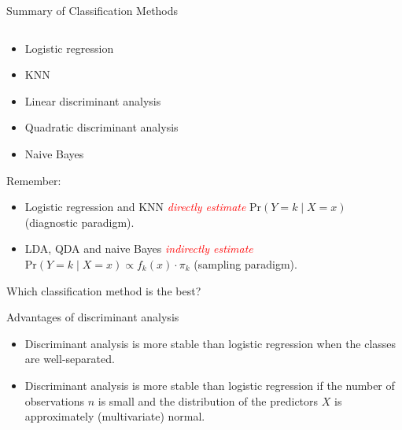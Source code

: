 \documentclass[10pt,ignorenonframetext,]{beamer}
\providecommand{\tightlist}{%
  \setlength{\itemsep}{0pt}\setlength{\parskip}{0pt}}
\begin{document}
\begin{frame}

\begin{block}{Summary of Classification Methods}

\(~\)

\begin{itemize}
\item
  Logistic regression
\item
  KNN
\item
  Linear discriminant analysis
\item
  Quadratic discriminant analysis
\item
  Naive Bayes
\end{itemize}

\vspace{4mm}

Remember:

\begin{itemize}
\tightlist
\item
  Logistic regression and KNN \emph{\textcolor{red}{directly estimate}}
  \(\text{Pr}(Y=k \mid X=x)\) (diagnostic paradigm).
\item
  LDA, QDA and naive Bayes \emph{\textcolor{red}{indirectly estimate}}
  \(\text{Pr}(Y=k \mid X=x) \propto f_k(x) \cdot \pi_k\) (sampling
  paradigm).
\end{itemize}

\vspace{2mm}

\end{block}

\end{frame}

\begin{frame}{Which classification method is the best?}
\protect\hypertarget{which-classification-method-is-the-best}{}

\begin{block}{Advantages of discriminant analysis}

\begin{itemize}
\tightlist
\item
  Discriminant analysis is more stable than logistic regression when the
  classes are well-separated.
\item
  Discriminant analysis is more stable than logistic regression if the
  number of observations \(n\) is small and the distribution of the
  predictors \(X\) is approximately (multivariate) normal.
\end{itemize}

\end{block}

\end{frame}
\end{document}
